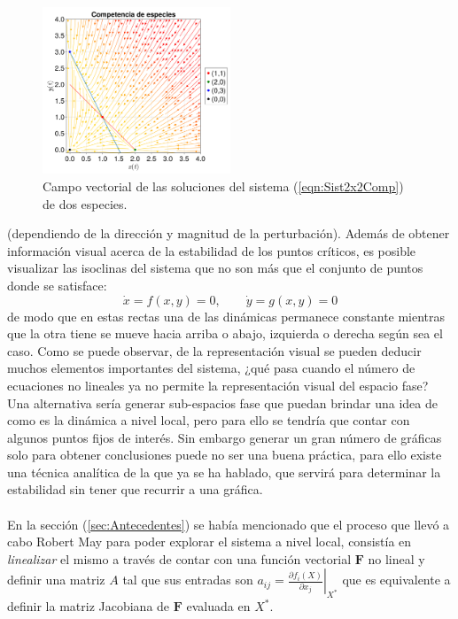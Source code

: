 \begin{figure} \vspace{-30pt} \begin{center}
		\includegraphics[width=0.5\textwidth]{../Imagenes/Competencia de especies} 
	\end{center} 
	\vspace{-20pt} 
	\caption{Campo vectorial de las soluciones del sistema (\ref{eqn:Sist2x2Comp}) de dos especies.} 
	\vspace{10pt}
	\label{fig:CompetenciaEspecies}
\end{figure} 
(dependiendo de la dirección y magnitud de la perturbación).
\setlength{\parindent}{0cm} Además de obtener información visual acerca de la estabilidad de los puntos críticos, es posible visualizar las isoclinas del sistema que no son más que el conjunto de puntos donde se satisface:
\begin{equation*}
	\dot{x}=f(x,y)=0,\qquad\dot{y}=g(x,y)=0
\end{equation*}
de modo que en estas rectas una de las dinámicas permanece constante mientras que la otra tiene se mueve hacia arriba o abajo, izquierda o derecha según sea el caso. Como se puede observar, de la representación visual se pueden deducir muchos elementos importantes del sistema, ¿qué pasa cuando el número de ecuaciones no lineales ya no permite la representación visual del espacio fase? Una alternativa sería generar sub-espacios fase que puedan brindar una idea de como es la dinámica a nivel local, pero para ello se tendría que contar con algunos puntos fijos de interés. Sin embargo generar un gran número de gráficas solo para obtener conclusiones puede no ser una buena práctica, para ello existe una técnica analítica de la que ya se ha hablado, que servirá para determinar la estabilidad sin tener que recurrir a una gráfica.
\\
\\
En la sección (\ref{sec:Antecedentes}) se había mencionado que el proceso que llevó a cabo Robert May para poder explorar el sistema a nivel local, consistía en \textit{linealizar} el mismo a través de contar con una función vectorial $\textbf{F}$ no lineal y definir una matriz $A$ tal que sus entradas son $a_{ij}=\left .\frac{\partial f_i(X)}{\partial x_j}\right |_{X^*}$ que es equivalente a definir la matriz Jacobiana de $\textbf{F}$ evaluada en $X^*$.

